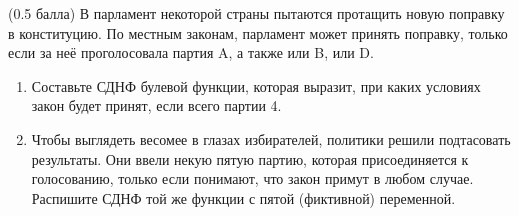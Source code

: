 \question
(0.5 балла) В парламент некоторой страны пытаются протащить новую поправку в конституцию. По местным законам, парламент может принять поправку, только если за неё проголосовала партия A, а также или B, или D.

\begin{enumerate}
    \item Составьте СДНФ булевой функции, которая выразит, при каких условиях закон будет принят, если всего партии 4.
    \item Чтобы выглядеть весомее в глазах избирателей, политики решили подтасовать результаты.  Они ввели некую пятую партию, которая присоединяется к голосованию, только если понимают, что закон примут в любом случае. Распишите СДНФ той же функции с пятой (фиктивной) переменной.
\end{enumerate}